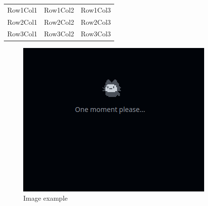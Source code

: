 \documentclass{article}
\begin{document}
\begin{tabular}{ccc}
\hline
Row1Col1 & Row1Col2 & Row1Col3 \\
Row2Col1 & Row2Col2 & Row2Col3 \\
Row3Col1 & Row3Col2 & Row3Col3 \\
\hline
\end{tabular}

\begin{figure}[h!]
    \centering
    \includegraphics[width=\textwidth]{artifacts/test_image.png}
    \caption{Image example}
    \label{fig:sample_image}
\end{figure}
    
\end{document}
